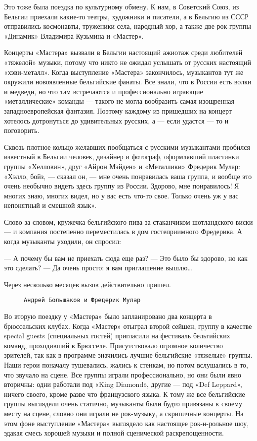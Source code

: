 Это тоже была поездка по культурному обмену. К нам, в Советский Союз, из Бельгии приехали какие-то театры, художники и
писатели, а в Бельгию из СССР отправились космонавты, труженики села, народный хор, а также две рок-группы «Динамик»
Владимира Кузьмина и «Мастер».

Концерты «Мастера» вызвали в Бельгии настоящий ажиотаж среди любителей «тяжелой» музыки, потому что никто не ожидал
услышать от русских настоящий «хэви-металл». Когда выступление «Мастера» закончилось, музыкантов тут же окружили
новоявленные бельгийские фанаты. Все знали, что в России есть волки и медведи, но что там встречаются и профессионально
играющие «металлические» команды — такого не могла вообразить самая изощренная западноевропейская фантазия. Поэтому
каждому из пришедших на концерт хотелось дотронуться до удивительных русских, а — если удастся — то и поговорить.

Сквозь плотное кольцо желавших пообщаться с русскими музыкантами пробился известный в Бельгии человек, дизайнер и
фотограф, оформлявший пластинки группы «Хелловин», друг «Айрон Мэйден» и «Металлики» Фредерик Мулар: «Хэлло, бойз, —
сказал он, — мне очень понравилась ваша группа, и вообще это очень необычно видеть здесь группу из России. Здорово, мне
понравилось! Я многих знаю, многих видел, но у вас есть что-то свое. Только очень уж у вас непонятный и смешной язык».

Слово за словом, кружечка бельгийского пива за стаканчиком шотландского виски — и компания постепенно переместилась в
дом гостеприимного Фредерика. А когда музыканты уходили, он спросил:

— А почему бы вам не приехать сюда еще раз?
— Это было бы здорово, но как это сделать?
— Да очень просто: я вам приглашение вышлю\ldots

Через несколько месяцев вызов действительно пришел.

\begin{wrapfigure}{R}{0.5\textwidth}
    \centering
    \caption{\texttt{Андрей Большаков и Фредерик Мулар}}
\end{wrapfigure}

Во вторую поездку у «Мастера» было запланировано два концерта в брюссельских клубах. Когда «Мастер» отыграл второй
сейшен, группу в качестве special guests (специальных гостей) пригласили на фестиваль бельгийских команд, проходивший в
Брюсселе. Присутствовало огромное количество зрителей, так как в программе значились лучшие бельгийские «тяжелые»
группы. Наши герои поначалу тушевались, жались к стенкам, но потом вслушались в то, что звучало на сцене. Все группы
играли профессионально, но они были явно вторичны: одни работали под «King Diamond», другие — под «Def Leppard», ничего
своего, кроме разве что французского языка. К тому же все бельгийские группы выглядели очень статично, музыканты были
будто привязаны к своему месту на сцене, словно они играли не рок-музыку, а скрипичные концерты. На этом фоне
выступление «Мастера» выглядело как настоящее рок-н-рольное шоу, эдакая смесь хорошей музыки и полной сценической
раскрепощенности.

